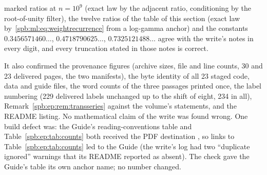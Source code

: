 \begin{writenote}
\begin{itemize}
marked ratios at $n=10^9$ (exact law by the adjacent ratio, conditioning by
the root-of-unity filter), the twelve ratios of the table of this section
(exact law by~\eqref{spb:ml:eq:weightrecurrence} from a log-gamma anchor) and
the constants $0.3456571460\ldots$, $0.4718790625\ldots$,
$0.7325121488\ldots$ agree with the write's notes in every digit, and every
truncation stated in those notes is correct.
\end{itemize}
It also confirmed the provenance figures (archive sizes, file and line counts,
30 and 23 delivered pages, the two manifests), the byte identity of all 23
staged code, data and guide files, the word counts of the three passages
printed once, the label numbering (229 delivered labels unchanged up to the
shift of eight, 234 in all), Remark~\ref{spb:ep:rem:transseries} against the
volume's statements, and the README listing. No mathematical claim of the
write was found wrong. One build defect was: the Guide's reading-conventions
table and Table~\ref{spb:ep:tab:counts} both received the PDF destination
, so links to Table~\ref{spb:ep:tab:counts} led to the Guide
(the write's log had two ``duplicate ignored'' warnings that its README
reported as absent). The check gave the Guide's table its own anchor name;
no number changed.
\end{writenote}
